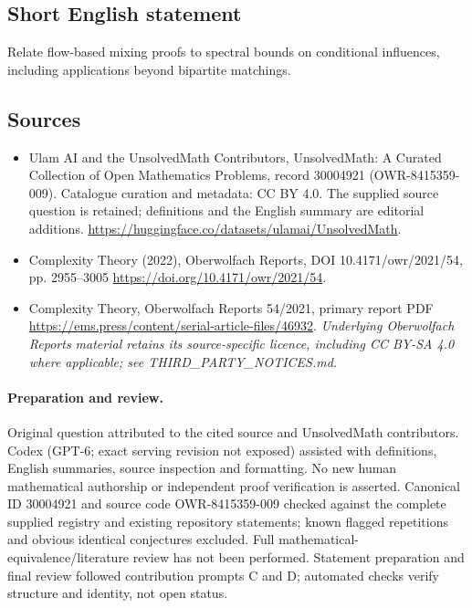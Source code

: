 \documentclass[11pt]{article}
\begin{document}
\subsection{Short English statement}
Relate flow-based mixing proofs to spectral bounds on conditional influences, including applications beyond bipartite matchings.
\subsection{Sources}
\begin{itemize}
\item[\hypertarget{source:30004921:1}{S1}] Ulam AI and the UnsolvedMath Contributors, UnsolvedMath: A Curated Collection of Open Mathematics Problems, record 30004921 (OWR-8415359-009). Catalogue curation and metadata: CC BY 4.0. The supplied source question is retained; definitions and the English summary are editorial additions.
\url{https://huggingface.co/datasets/ulamai/UnsolvedMath}.
\item[\hypertarget{source:30004921:2}{S2}] Complexity Theory (2022), Oberwolfach Reports, DOI 10.4171/owr/2021/54, pp. 2955--3005
\url{https://doi.org/10.4171/owr/2021/54}.
\item[\hypertarget{source:30004921:3}{S3}] Complexity Theory, Oberwolfach Reports 54/2021, primary report PDF
\url{https://ems.press/content/serial-article-files/46932}.
\textit{Underlying Oberwolfach Reports material retains its source-specific licence, including CC BY-SA 4.0 where applicable; see THIRD\_PARTY\_NOTICES.md.}
\end{itemize}
\paragraph{Preparation and review.}
Original question attributed to the cited source and UnsolvedMath contributors. Codex (GPT-6; exact serving revision not exposed) assisted with definitions, English summaries, source inspection and formatting. No new human mathematical authorship or independent proof verification is asserted. Canonical ID 30004921 and source code OWR-8415359-009 checked against the complete supplied registry and existing repository statements; known flagged repetitions and obvious identical conjectures excluded. Full mathematical-equivalence/literature review has not been performed. Statement preparation and final review followed contribution prompts C and D; automated checks verify structure and identity, not open status.
\label{end:30004921}
\end{document}
